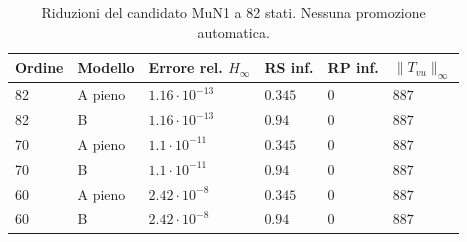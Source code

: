 \begin{table}[htbp]\centering\small
\begin{tabular}{llllll}\toprule
Ordine & Modello & Errore rel. $H_\infty$ & RS inf. & RP inf. & $\|T_{vu}\|_\infty$\\\midrule
82 & A pieno & $1.16\cdot10^{-13}$ & $0.345$ & $0$ & $887$\\
82 & B & $1.16\cdot10^{-13}$ & $0.94$ & $0$ & $887$\\
70 & A pieno & $1.1\cdot10^{-11}$ & $0.345$ & $0$ & $887$\\
70 & B & $1.1\cdot10^{-11}$ & $0.94$ & $0$ & $887$\\
60 & A pieno & $2.42\cdot10^{-8}$ & $0.345$ & $0$ & $887$\\
60 & B & $2.42\cdot10^{-8}$ & $0.94$ & $0$ & $887$\\
\bottomrule\end{tabular}
\caption{Riduzioni del candidato MuN1 a 82 stati. Nessuna promozione automatica.}
\end{table}
